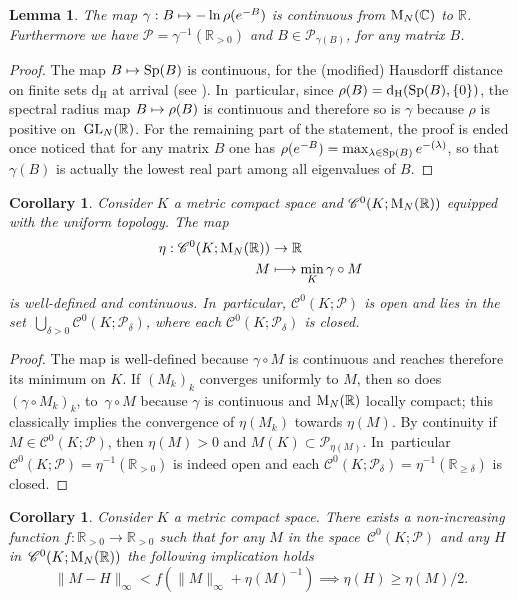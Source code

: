 \documentclass[JEP,XML,SOM,Unicode,published]{cedram}
\newcommand\mto{\mathchoice{\longmapsto}{\mapsto}{\mapsto}{\mapsto}}
\let\Re\relax
\DeclareMathOperator{\Re}{Re}
\newtheorem{lem}[prop]{Lemma}
\newtheorem{coro}[prop]{Corollary}
\theoremstyle{definition}
\newcommand\R{\mathbb{R}}
\newcommand\dd{\mathrm{d}}
\renewcommand\H{\mathrm{H}}
\begin{document}
\begin{lem}\label{lem:gampet}
The map $\gamma:B\mto -\ln \rho(e^{-B})$ is continuous from $\textnormal{M}_N(\mathbb{C})$ to $\R$. Furthermore we have $\mathscr{P} = \gamma^{-1}(\R_{>0})$ and $B\in\mathscr{P}_{\gamma(B)}$, for any matrix $B$.
\end{lem}
\begin{proof}
The map $B\mto \textnormal{Sp}(B)$ is continuous, for the (modified) Hausdorff distance on finite sets $\dd_{\H}$ at arrival (see \cite[Th.\,5.2]{serre}). In~particular, since $\rho(B) = \dd_{\H}(\textnormal{Sp}(B),\{0\})$, the spectral radius map $B\mto \rho(B)$ is continuous and therefore so is $\gamma$ because $\rho$ is positive on~$\textnormal{GL}_N(\mathbb{R})$. For the remaining part of the statement, the proof is ended once noticed that for any matrix $B$ one has $\rho(e^{-B}) = \max_{\lambda \in\textnormal{Sp}(B)} e^{-\Re(\lambda)}$, so that $\gamma(B)$ is actually the lowest real part among all eigenvalues of $B$.
\end{proof}
\begin{coro}\label{coro:thetapet}
Consider $K$ a metric compact space and $\mathscr{C}^0(K;\textnormal{M}_N(\R))$ equipped with the uniform topology. The map
\begin{align*}
\eta:\mathscr{C}^0(K;\textnormal{M}_N(\R)) &\to\R\\
M &\mto \min_K \gamma \circ M
\end{align*}
is well-defined and continuous. In~particular, $\mathscr{C}^0(K;\mathscr{P})$ is open and lies in the set~$\bigcup_{\delta>0}\mathscr{C}^0(K;\mathscr{P}_\delta)$, where each $\mathscr{C}^0(K;\mathscr{P}_\delta)$ is closed.
\end{coro}
\begin{proof}
The map is well-defined because $\gamma\circ M$ is continuous and reaches therefore its minimum on $K$. If $(M_k)_k$ converges uniformly to $M$, then so does $(\gamma \circ M_k)_k$, to~$\gamma \circ M$ because $\gamma$ is continuous and $\textnormal{M}_N(\mathbb{R})$ locally compact; this classically implies the convergence of $\eta(M_k)$ towards $\eta(M)$. By continuity if $M\in\mathscr{C}^0(K;\mathscr{P})$, then $\eta(M)>0$ and $M(K)\subset\mathscr{P}_{\eta(M)}$. In~particular $\mathscr{C}^0(K;\mathscr{P}) = \eta^{-1}(\R_{>0})$ is indeed open and each $\mathscr{C}^0(K;\mathscr{P}_\delta) = \eta^{-1}(\R_{\geq \delta})$ is closed.
\end{proof}
\begin{coro}\label{coro:etahold}
Consider $K$ a metric compact space. There exists a non-increasing function $f:\R_{>0}\to\R_{>0}$ such that for any $M$ in the space~$\mathscr{C}^{0}(K;\mathscr{P})$ and any $H$ in~$\mathscr{C}^0(K;\textnormal{M}_N(\R))$ the following implication holds
\[
\|M-H\|_\infty < f(\|M\|_\infty+\eta(M)^{-1})\implies \eta(H)\geq \eta(M)/2.
\]
\end{coro}
\end{document}
